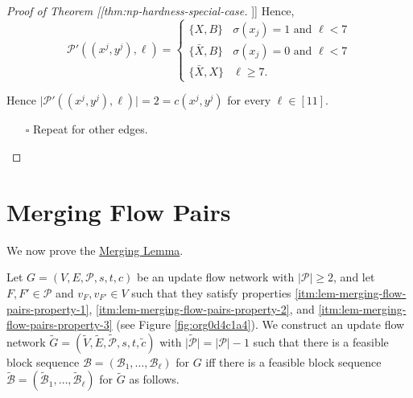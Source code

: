 \documentclass[fontsize=11pt,paper=a4]{book}
\begin{document}
\begin{proof}[Proof of Theorem [[thm:np-hardness-special-case]]]
Hence,
\[\mathcal{P}'((x^j,y^j),\ell)=
\begin{cases}
\{X,B\} & \sigma(x_j)=1\text{ and }\ell<7\\
\{\bar{X},B\} & \sigma(x_j)=0\text{ and }\ell<7\\
\{\bar{X},X\} & \ell\geq 7.
\end{cases}\]

Hence \(\lvert\mathcal{P}'((x^j,y^j),\ell)\rvert=2=c(x^j,y^j)\) for every \(\ell\in[11]\).

\begin{itemize}
\item[{$\square$}] Repeat for other edges.
\end{itemize}
\end{proof}

\chapter{Merging Flow Pairs}
\label{sec:org60bcd4c}

We now prove the \hyperref[orgf9b0f0c]{Merging Lemma}.

Let \(G=(V,E,\mathcal{P},s,t,c)\) be an update flow network with \(\lvert\mathcal{P}\rvert\geq 2\), and let \(F,F'\in\mathcal{P}\) and \(v_F,v_{F'}\in V\) such that they satisfy properties \ref{itm:lem-merging-flow-pairs-property-1}, \ref{itm:lem-merging-flow-pairs-property-2}, and \ref{itm:lem-merging-flow-pairs-property-3} (see Figure \ref{fig:org0d4c1a4}).
We construct an update flow network \(\tilde{G}=(\tilde{V},\tilde{E},\tilde{\mathcal{P}},s,t,\tilde{c})\) with \(\lvert\tilde{\mathcal{P}}\rvert=\lvert\mathcal{P}\rvert-1\) such that there is a feasible block sequence \(\mathcal{B}=(\mathscr{B}_1,\dots,\mathscr{B}_{\ell})\) for \(G\) iff there is a feasible block sequence \(\tilde{\mathcal{B}}=(\tilde{\mathscr{B}}_1,\dots,\tilde{\mathscr{B}}_{\ell})\) for \(\tilde{G}\) as follows.
\end{document}
